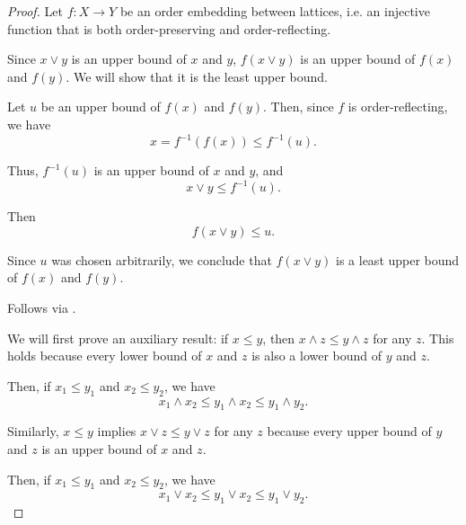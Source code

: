 \begin{proof}
   Let \( f: X \to Y \) be an order embedding between lattices, i.e. an injective function that is both order-preserving and order-reflecting.

   Since \( x \vee y \) is an upper bound of \( x \) and \( y \), \( f(x \vee y) \) is an upper bound of \( f(x) \) and \( f(y) \). We will show that it is the least upper bound.

  Let \( u \) be an upper bound of \( f(x) \) and \( f(y) \). Then, since \( f \) is order-reflecting, we have
  \begin{equation*}
    x = f^{-1}(f(x)) \leq f^{-1}(u).
  \end{equation*}

  Thus, \( f^{-1}(u) \) is an upper bound of \( x \) and \( y \), and
  \begin{equation*}
    x \vee y \leq f^{-1}(u).
  \end{equation*}

  Then
  \begin{equation*}
    f(x \vee y) \leq u.
  \end{equation*}

  Since \( u \) was chosen arbitrarily, we conclude that \( f(x \vee y) \) is a least upper bound of \( f(x) \) and \( f(y) \).

   Follows via .

   We will first prove an auxiliary result: if \( x \leq y \), then \( x \wedge z \leq y \wedge z \) for any \( z \). This holds because every lower bound of \( x \) and \( z \) is also a lower bound of \( y \) and \( z \).

  Then, if \( x_1 \leq y_1 \) and \( x_2 \leq y_2 \), we have
  \begin{equation*}
    x_1 \wedge x_2 \leq y_1 \wedge x_2 \leq y_1 \wedge y_2.
  \end{equation*}

  Similarly, \( x \leq y \) implies \( x \vee z \leq y \vee z \) for any \( z \) because every upper bound of \( y \) and \( z \) is an upper bound of \( x \) and \( z \).

  Then, if \( x_1 \leq y_1 \) and \( x_2 \leq y_2 \), we have
  \begin{equation*}
    x_1 \vee x_2 \leq y_1 \vee x_2 \leq y_1 \vee y_2.
  \end{equation*}
\end{proof}


